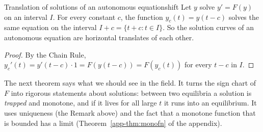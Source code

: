 \documentclass[11pt]{article}
\begin{document}
\begin{thm}{Translation of solutions of an autonomous equation}{shift}
Let $y$ solve $y'=F(y)$ on an interval $I$. For every constant $c$, the function $y_c(t)=y(t-c)$ solves the same equation on the interval $I+c=\{t+c:t\in I\}$. So the solution curves of an autonomous equation are horizontal translates of each other.
\end{thm}
\begin{proof}
By the Chain Rule, $y_c'(t)=y'(t-c)\cdot1=F(y(t-c))=F(y_c(t))$ for every $t-c$ in $I$.
\end{proof}

The next theorem says what we should see in the field. It turns the sign chart of $F$ into rigorous statements about solutions: between two equilibria a solution is \emph{trapped} and monotone, and if it lives for all large $t$ it runs into an equilibrium. It uses uniqueness (the Remark above) and the fact that a monotone function that is bounded has a limit (Theorem~\ref{app-thm:monofn} of the appendix).
\end{document}
